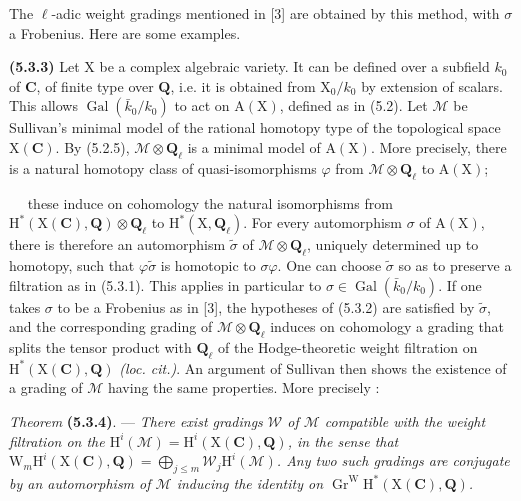 \documentclass[11pt,leqno]{article}
\newcommand{\Page}[1]{\ifvmode\noindent\else\unskip\ \fi{\footnotesize\textcolor{gray}{[p.\,#1]}}\ \ignorespaces}
\begin{document}
The \(\ell\)-adic weight gradings mentioned in [3] are obtained by this method, with \(\sigma\) a Frobenius. Here are some examples.

\textbf{(5.3.3)} Let \(\mathrm{X}\) be a complex algebraic variety. It can be defined over a subfield \(k_0\) of \(\mathbf{C}\), of finite type over \(\mathbf{Q}\), i.e. it is obtained from \(\mathrm{X}_0/k_0\) by extension of scalars. This allows \(\operatorname{Gal}(\bar{k}_0/k_0)\) to act on \(\mathrm{A}(\mathrm{X})\), defined as in (5.2). Let \(\mathcal{M}\) be Sullivan's minimal model of the rational homotopy type of the topological space \(\mathrm{X}(\mathbf{C})\). By (5.2.5), \(\mathcal{M}\otimes\mathbf{Q}_{\ell}\) is a minimal model of \(\mathrm{A}(\mathrm{X})\). More precisely, there is a natural homotopy class of quasi-isomorphisms \(\varphi\) from \(\mathcal{M}\otimes\mathbf{Q}_{\ell}\) to \(\mathrm{A}(\mathrm{X})\);

\Page{241}
these induce on cohomology the natural isomorphisms from
\(\mathrm{H}^*(\mathrm{X}(\mathbf{C}),\mathbf{Q})\otimes\mathbf{Q}_\ell\)
to \(\mathrm{H}^*(\mathrm{X},\mathbf{Q}_\ell)\). For every automorphism
\(\sigma\) of \(\mathrm{A}(\mathrm{X})\), there is therefore an automorphism
\(\widetilde{\sigma}\) of \(\mathscr{M}\otimes\mathbf{Q}_\ell\), uniquely determined
up to homotopy, such that \(\varphi\widetilde{\sigma}\) is homotopic to
\(\sigma\varphi\). One can choose \(\widetilde{\sigma}\) so as to preserve
a filtration as in (5.3.1). This applies in particular to
\(\sigma\in\operatorname{Gal}(\bar{k}_0/k_0)\). If one takes \(\sigma\)
to be a Frobenius as in [3], the hypotheses of (5.3.2) are satisfied by
\(\widetilde{\sigma}\), and the corresponding grading of
\(\mathscr{M}\otimes\mathbf{Q}_\ell\) induces on cohomology a grading
that splits the tensor product with \(\mathbf{Q}_\ell\) of the
Hodge-theoretic weight filtration on
\(\mathrm{H}^*(\mathrm{X}(\mathbf{C}),\mathbf{Q})\)
\textit{(loc. cit.)}. An argument of Sullivan then shows the existence
of a grading of \(\mathscr{M}\) having the same properties. More
precisely :

\textit{Theorem} \textbf{(5.3.4)}. — \textit{There exist gradings
\(\mathscr{W}\) of \(\mathscr{M}\) compatible with the weight filtration
on the \(\mathrm{H}^i(\mathscr{M})=\mathrm{H}^i(\mathrm{X}(\mathbf{C}),\mathbf{Q})\),
in the sense that
\(\mathrm{W}_m\mathrm{H}^i(\mathrm{X}(\mathbf{C}),\mathbf{Q})
=\bigoplus\limits_{j\leq m}\mathscr{W}_j\mathrm{H}^i(\mathscr{M})\).
Any two such gradings are conjugate by an automorphism of
\(\mathscr{M}\) inducing the identity on
\(\operatorname{Gr}^{\mathrm{W}}\mathrm{H}^*(\mathrm{X}(\mathbf{C}),\mathbf{Q})\).}
\end{document}
